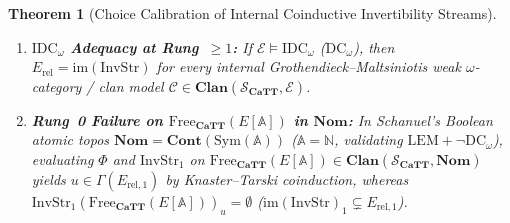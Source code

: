 \documentclass[10pt,twoside,openright]{book}
\theoremstyle{crmplain}
\newtheorem{theorem}{Theorem}[section]
\theoremstyle{crmdef}
\theoremstyle{crmremark}
\newcommand{\lean}[1]{\ignorespaces}
\newcommand{\leanwitness}{\ignorespaces}
\begin{document}
\begin{theorem}[Choice Calibration of Internal Coinductive Invertibility Streams]\label{thm:coinductive-stream-choice}%
\lean{HomotopyCRM.isStepSound_coindStepRel, HomotopyCRM.surjective_toRel_of_stepSound, HomotopyCRM.coindStepRel_iff_nonempty_pureInvStream, HomotopyCRM.globularInvTree_isCoindEquiv, HomotopyCRM.isCoindEquiv_iff_nonempty_globularInvTree, HomotopyCRM.exists_freshChain_supported_of_card_le, HomotopyCRM.not_hasFiniteSupport_freshStream, HomotopyCRM.isEmpty_nominal_freshRootStream, HomotopyCRM.theorem9B_choice_calibration_of_coinductive_streams}%
\leanwitness%
%
\leavevmode
\begin{enumerate}[label=(\arabic*),leftmargin=2em]
  \item \textbf{$\mathrm{IDC}_\omega$ Adequacy at Rung~$\ge 1$:} If $\mathcal{E} \models \mathrm{IDC}_\omega$ ($\mathrm{DC}_\omega$), then $E_{\mathrm{rel}} = \mathrm{im}(\mathrm{InvStr})$ for every internal Grothendieck--Maltsiniotis weak $\omega$-category / clan model $\mathcal{C} \in \mathbf{Clan}(\mathcal{S}_{\mathbf{CaTT}}, \mathcal{E})$.
  \item \textbf{Rung~0 Failure on $\mathrm{Free}_{\mathbf{CaTT}}(E[\mathbb{A}])$ in $\mathbf{Nom}$:} In Schanuel's Boolean atomic topos $\mathbf{Nom} = \mathbf{Cont}(\mathrm{Sym}(\mathbb{A}))$ ($\mathbb{A} = \mathbb{N}$, validating $\mathrm{LEM} + \neg\mathrm{DC}_\omega$), evaluating $\Phi$ and $\mathrm{InvStr}_1$ on $\mathrm{Free}_{\mathbf{CaTT}}(E[\mathbb{A}]) \in \mathbf{Clan}(\mathcal{S}_{\mathbf{CaTT}}, \mathbf{Nom})$ yields $u \in \Gamma(E_{\mathrm{rel}, 1})$ by Knaster--Tarski coinduction, whereas $\mathrm{InvStr}_1(\mathrm{Free}_{\mathbf{CaTT}}(E[\mathbb{A}]))_u = \emptyset$ ($\mathrm{im}(\mathrm{InvStr})_1 \subsetneq E_{\mathrm{rel}, 1}$).
\end{enumerate}
\end{theorem}
\end{document}
